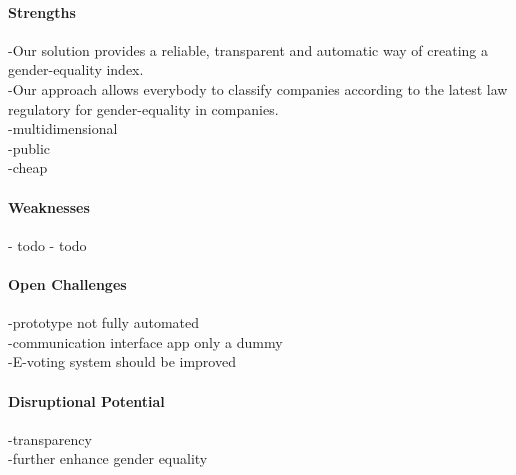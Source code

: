 \paragraph*{Strengths}
-Our solution provides a reliable, transparent and automatic way of creating a gender-equality index.\\
-Our approach allows everybody to classify companies according to the latest law regulatory for gender-equality in companies.\\
-multidimensional\\
-public\\
-cheap\\

\paragraph*{Weaknesses}
- todo
- todo

\paragraph*{Open Challenges}
-prototype not fully automated\\
-communication interface app only a dummy\\
-E-voting system should be improved\\

	
\paragraph*{Disruptional Potential}
-transparency\\
-further enhance gender equality